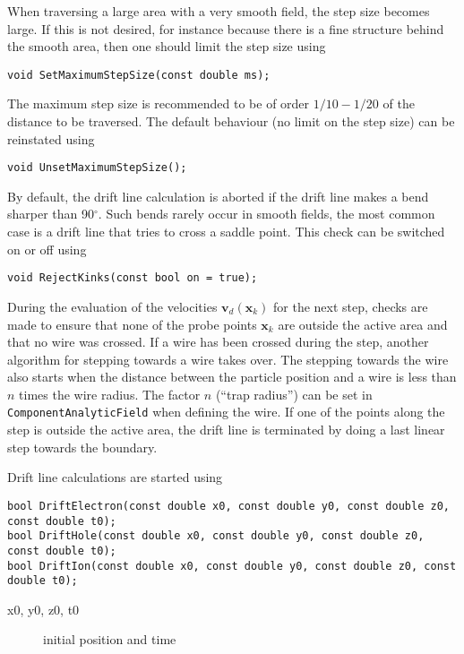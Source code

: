 When traversing a large area with a very smooth field, the step size becomes large. 
If this is not desired, for instance because there is a fine structure behind the 
smooth area, then one should limit the step size using
\begin{lstlisting}
void SetMaximumStepSize(const double ms);
\end{lstlisting}
The maximum step size is recommended to be of order $1/10 - 1/20$ 
of the distance to be traversed. The default behaviour (no limit on the step size) 
can be reinstated using
\begin{lstlisting}
void UnsetMaximumStepSize();
\end{lstlisting}

By default, the drift line calculation is aborted if the drift line makes a bend 
sharper than 90$^{\circ}$. Such bends rarely occur in smooth fields, 
the most common case is a drift line that tries to cross a saddle point. 
This check can be switched on or off using
\begin{lstlisting}
void RejectKinks(const bool on = true);
\end{lstlisting} 

During the evaluation of the velocities $\mathbf{v}_{d}\left(\mathbf{x}_{k}\right)$
for the next step, checks are made to ensure that none of the probe points 
$\mathbf{x}_{k}$ are outside the active area and that no wire was crossed.
If a wire has been crossed during the step, another algorithm for stepping towards 
a wire takes over. The stepping towards the wire also starts when 
the distance between the particle position and a wire is less than
$n$ times the wire radius. The factor $n$ 
(``trap radius'') can be set in \texttt{ComponentAnalyticField} when defining the wire. 
If one of the points along the step is outside the active area,
the drift line is terminated by doing a last linear step towards the boundary.

Drift line calculations are started using 
\begin{lstlisting}
bool DriftElectron(const double x0, const double y0, const double z0, const double t0);
bool DriftHole(const double x0, const double y0, const double z0, const double t0);
bool DriftIon(const double x0, const double y0, const double z0, const double t0);
\end{lstlisting}
\begin{description}
  \item[x0, y0, z0, t0] initial position and time
\end{description}


